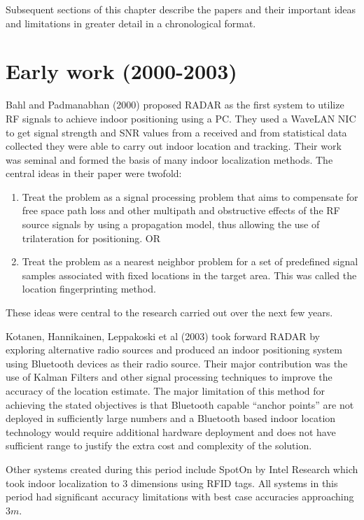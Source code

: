 Subsequent sections of this chapter describe the papers and their important
ideas and limitations in greater detail in a chronological format.

\section{Early work (2000-2003)}

Bahl and Padmanabhan\cite{RADAR} (2000) proposed RADAR as the first system to utilize RF signals to achieve indoor positioning using a PC. They used a WaveLAN NIC to get signal strength and SNR values from a received and from statistical data collected they were able to carry out indoor location and tracking. Their work was seminal and formed the basis of many indoor localization methods. The central ideas in their paper were twofold:

\begin{enumerate}
\item Treat the problem as a signal processing problem that aims to compensate for free space path loss and other multipath and obstructive effects of the RF source signals by using a propagation model, thus allowing the use of trilateration for positioning. OR
\item Treat the problem as a nearest neighbor problem for a set of predefined signal samples associated with fixed locations in the target area. This was called the location fingerprinting method.
\end{enumerate}

These ideas were central to the research carried out over the next few years.

Kotanen, Hannikainen, Leppakoski et al\cite{Kotanen} (2003) took forward RADAR by exploring alternative radio sources and produced an indoor positioning system using Bluetooth devices as their radio source. Their major contribution was the use of Kalman Filters and other signal processing techniques to improve the accuracy of the location estimate. The major limitation of this method for achieving the stated objectives is that Bluetooth capable “anchor points” are not deployed in sufficiently large numbers and a Bluetooth based indoor location technology would require additional hardware deployment and does not have sufficient range to justify the extra cost and complexity of the solution.

Other systems created during this period include SpotOn\cite{SpotON} by Intel Research which took indoor localization to 3 dimensions using RFID tags. All systems in this period had significant accuracy limitations with best case accuracies 
approaching $3 m$.

